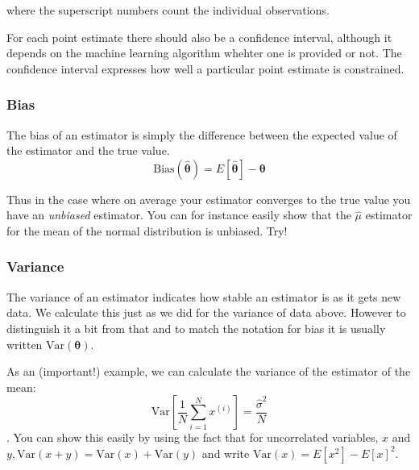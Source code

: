 \documentclass[a4paper,10pt]{article}
\begin{document}
where the superscript numbers count the individual observations.

For each point estimate there should also be a confidence interval, although it depends on the machine learning algorithm whehter one is provided or not. The confidence interval expresses how well a particular point estimate is constrained.

\subsubsection{ Bias}

The bias of an estimator is simply the difference between the expected value of the estimator and the true value.
$$\mathrm{Bias}(\hat{\boldsymbol{\theta}}) = E\left[\hat{\boldsymbol{\theta}}\right] - \boldsymbol{\theta} $$

Thus in the case where on average your estimator converges to the true value you have an \textit{unbiased} estimator. You can for instance easily show that the $\hat{\mu}$ estimator for the mean of the normal distribution is unbiased. Try!

\subsubsection{ Variance}

The variance of an estimator indicates how stable an estimator is as it gets new data. We calculate this just as we did for the variance of data above. However to distinguish it a bit from that and to match the notation for bias it is usually written $\mathrm{Var}(\boldsymbol{\theta})$.

As an (important!) example, we can calculate the variance of the estimator of the mean:
$$\mathrm{Var}\left[\frac{1}{N} \sum_{i=1}^N x^{(i)}\right] = \frac{\hat{\sigma}^2}{N}$$.
You can show this easily by using the fact that for uncorrelated variables, $x$ and $y, \mathrm{Var}(x+y) = \mathrm{Var}(x) + \mathrm{Var}(y)$ and write $\mathrm{Var}(x) = E\left[x^2
\right] - E\left[x\right]^2$.
\end{document}
